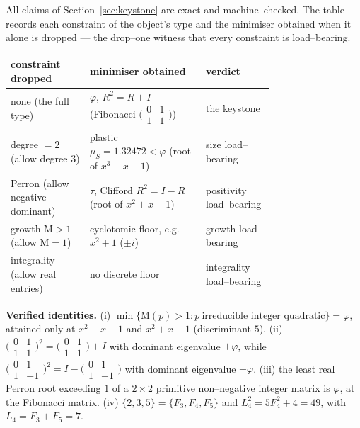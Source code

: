 \documentclass[11pt]{article}
\theoremstyle{plain}
\theoremstyle{definition}
\theoremstyle{remark}
\newcommand{\Mah}{\mathrm{M}}
\begin{document}
All claims of Section~\ref{sec:keystone} are exact and machine--checked. The table records each constraint of the object's type and the minimiser obtained when it alone is dropped --- the drop--one witness that every constraint is load--bearing.

\begin{center}
\renewcommand{\arraystretch}{1.25}
\begin{tabular}{@{}p{0.30\linewidth} p{0.44\linewidth} l@{}}
\toprule
constraint dropped & minimiser obtained & verdict \\
\midrule
none (the full type) & $\varphi$, $R^2=R+I$ (Fibonacci $\bigl(\begin{smallmatrix}0&1\\1&1\end{smallmatrix}\bigr)$) & the keystone \\
degree $=2$ (allow degree $3$) & plastic $\mu_S=1.32472<\varphi$ (root of $x^3-x-1$) & size load--bearing \\
Perron (allow negative dominant) & $\tau$, Clifford $R^2=I-R$ (root of $x^2+x-1$) & positivity load--bearing \\
growth $\Mah>1$ (allow $\Mah=1$) & cyclotomic floor, e.g.\ $x^2+1$ ($\pm i$) & growth load--bearing \\
integrality (allow real entries) & no discrete floor & integrality load--bearing \\
\bottomrule
\end{tabular}
\end{center}

\noindent\textbf{Verified identities.} (i) $\min\{\Mah(p)>1:p\ \text{irreducible integer quadratic}\}=\varphi$, attained only at $x^2-x-1$ and $x^2+x-1$ (discriminant $5$). (ii) $\bigl(\begin{smallmatrix}0&1\\1&1\end{smallmatrix}\bigr)^2=\bigl(\begin{smallmatrix}0&1\\1&1\end{smallmatrix}\bigr)+I$ with dominant eigenvalue $+\varphi$, while $\bigl(\begin{smallmatrix}0&1\\1&-1\end{smallmatrix}\bigr)^2=I-\bigl(\begin{smallmatrix}0&1\\1&-1\end{smallmatrix}\bigr)$ with dominant eigenvalue $-\varphi$. (iii) the least real Perron root exceeding $1$ of a $2\times2$ primitive non--negative integer matrix is $\varphi$, at the Fibonacci matrix. (iv) $\{2,3,5\}=\{F_3,F_4,F_5\}$ and $L_4^2=5F_4^2+4=49$, with $L_4=F_3+F_5=7$.
\end{document}
